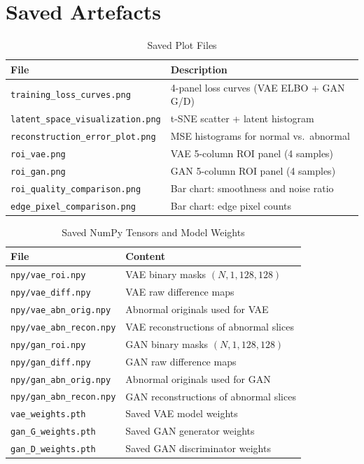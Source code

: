 \documentclass[12pt,a4paper]{article}
\begin{document}
\section{Saved Artefacts}
\label{sec:artefacts}

\begin{table}[H]
\centering
\caption{Saved Plot Files}
\begin{tabular}{ll}
\toprule
\textbf{File}                            & \textbf{Description} \\
\midrule
\texttt{training\_loss\_curves.png}      & 4-panel loss curves (VAE ELBO + GAN G/D) \\
\texttt{latent\_space\_visualization.png}& t-SNE scatter + latent histogram \\
\texttt{reconstruction\_error\_plot.png} & MSE histograms for normal vs.\ abnormal \\
\texttt{roi\_vae.png}                    & VAE 5-column ROI panel (4 samples) \\
\texttt{roi\_gan.png}                    & GAN 5-column ROI panel (4 samples) \\
\texttt{roi\_quality\_comparison.png}    & Bar chart: smoothness and noise ratio \\
\texttt{edge\_pixel\_comparison.png}     & Bar chart: edge pixel counts \\
\bottomrule
\end{tabular}
\end{table}

\begin{table}[H]
\centering
\caption{Saved NumPy Tensors and Model Weights}
\begin{tabular}{ll}
\toprule
\textbf{File}                   & \textbf{Content} \\
\midrule
\texttt{npy/vae\_roi.npy}       & VAE binary masks $(N,1,128,128)$ \\
\texttt{npy/vae\_diff.npy}      & VAE raw difference maps \\
\texttt{npy/vae\_abn\_orig.npy} & Abnormal originals used for VAE \\
\texttt{npy/vae\_abn\_recon.npy}& VAE reconstructions of abnormal slices \\
\texttt{npy/gan\_roi.npy}       & GAN binary masks $(N,1,128,128)$ \\
\texttt{npy/gan\_diff.npy}      & GAN raw difference maps \\
\texttt{npy/gan\_abn\_orig.npy} & Abnormal originals used for GAN \\
\texttt{npy/gan\_abn\_recon.npy}& GAN reconstructions of abnormal slices \\
\texttt{vae\_weights.pth}       & Saved VAE model weights \\
\texttt{gan\_G\_weights.pth}    & Saved GAN generator weights \\
\texttt{gan\_D\_weights.pth}    & Saved GAN discriminator weights \\
\bottomrule
\end{tabular}
\end{table}
\end{document}
